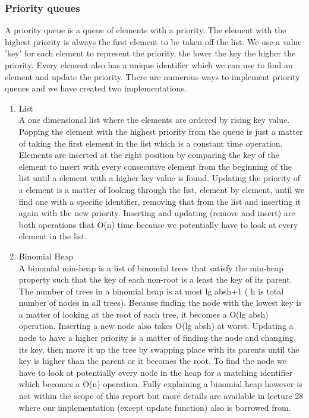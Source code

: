 \documentclass[12pt, a4paper]{article}
\begin{document}


\subsubsection{Priority queues}

\label{Priority queues}


A priority queue is a queue of elements with a priority. The element with
the highest priority is always the first element to be taken off the list.
We use a value 'key' for each element to represent the priority, the lower
the key the higher the priority. Every element also has a unique identifier
which we can use to find an element and update the priority. There are
numerous ways to implement priority queues and we have created two
implementations.


\begin{enumerate}

\item{List}\\

A one dimensional list where the elements are ordered by rising key value.
Popping the element with the highest priority from the queue is just a
matter of taking the first element in the list which is a constant time
operation. Elements are inserted at the right position by comparing the key
of the element to insert with every consecutive element from the beginning
of the list until a element with a higher key value is found. Updating the
priority of a element is a matter of looking through the list, element by
element, until we find one with a specific identifier, removing that from
the list and inserting it again with the new priority. Inserting and
updating (remove and insert) are both operations that O(n) time because we
potentially have to look at every element in the list.


\item{Binomial Heap}\\

A binomial min-heap is a list of binomial trees that satisfy the min-heap
property such that the key of each non-root is a least the key of its
parent. The number of trees in a binomial heap is at most lg abs{h}+1 ( h
is total number of nodes in all trees). Because finding the node with the
lowest key is a matter of looking at the root of each tree, it becomes a
O(lg abs{h}) operation. Inserting a new node also takes O(lg abs{h}) at
worst. Updating a node to have a higher priority is a matter of finding the
node and changing its key, then move it up the tree by swapping place with
its parents until the key is higher than the parent or it becomes the root.
To find the node we have to look at potentially every node in the heap for
a matching identifier which becomes a O(n) operation. Fully explaining a
binomial heap however is not within the scope of this report but more
details are available in lecture 28 \cite{lecture28} where our
implementation (except update function) also is borrowed from.


\end{enumerate}
\end{document}
